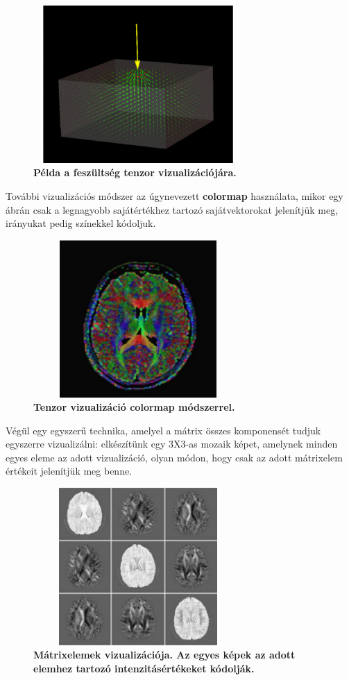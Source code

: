 \documentclass[12pt]{article}
\theoremstyle{plain}
\begin{document}
\begin{figure}[H]
   \centering
   \includegraphics[width=8cm, height=6cm]{media/stress.png}
   \caption{\textbf{Példa a feszültség tenzor vizualizációjára.}}
   \label{fig:GeneralDiagram}
\end{figure}

További vizualizációs módszer az úgynevezett \textbf{colormap} használata, mikor egy ábrán csak a legnagyobb sajátértékhez tartozó sajátvektorokat jelenítjük meg, irányukat pedig színekkel kódoljuk. 

\begin{figure}[H]
   \centering
   \includegraphics[width=8cm, height=6cm]{media/colormap.PNG}
   \caption{\textbf{Tenzor vizualizáció colormap módszerrel.}}
   \label{fig:GeneralDiagram}
\end{figure}

Végül egy egyszerű technika, amelyel a mátrix összes komponensét tudjuk egyszerre vizualizálni: elkészítünk egy 3X3-as mozaik képet, amelynek minden egyes eleme az adott vizualizáció, olyan módon, hogy csak az adott mátrixelem értékeit jelenítjük meg benne.

\begin{figure}[H]
   \centering
   \includegraphics[width=8cm, height=6cm]{media/brain.PNG}
   \caption{\textbf{Mátrixelemek vizualizációja. Az egyes képek az adott elemhez tartozó intenzitásértékeket kódolják.}}
   \label{fig:GeneralDiagram}
\end{figure}
\end{document}

